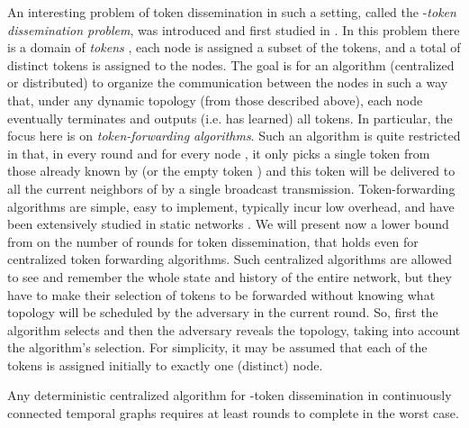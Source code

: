 \documentclass[oribibl, 11pt]{llncs}
\begin{document}
An interesting problem of token dissemination in such a setting, called the -\emph{token dissemination problem}, was introduced and first studied in \cite{KLO10}. In this problem there is a domain of \emph{tokens} , each node is assigned a subset of the tokens, and a total of  distinct tokens is assigned to the nodes. The goal is for an algorithm (centralized or distributed) to organize the communication between the nodes in such a way that, under any dynamic topology (from those described above), each node eventually terminates and outputs (i.e. has learned) all  tokens. In particular, the focus here is on \emph{token-forwarding algorithms}. Such an algorithm is quite restricted in that, in every round  and for every node , it only picks a single token from those already known by  (or the empty token ) and this token will be delivered to all the current neighbors of  by a single broadcast transmission. Token-forwarding algorithms are simple, easy to implement, typically incur low overhead, and have been extensively studied in static networks \cite{Le92,Pe00}. We will present now a lower bound from \cite{KLO10} on the number of rounds for token dissemination, that holds even for centralized token forwarding algorithms. Such centralized algorithms are allowed to see and remember the whole state and history of the entire network, but they have to make their selection of tokens to be forwarded without knowing what topology will be scheduled by the adversary in the current round. So, first the algorithm selects and then the adversary reveals the topology, taking into account the algorithm's selection. For simplicity, it may be assumed that each of the  tokens is assigned initially to exactly one (distinct) node.  

\begin{theorem}  \label{the:klo10-lower-bound}
Any deterministic centralized algorithm for -token dissemination in continuously connected temporal graphs requires at least  rounds to complete in the worst case.
\end{theorem}
\end{document}
